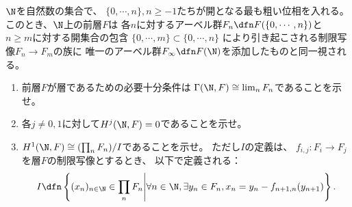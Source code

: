 \documentclass[uplatex,dvipdfmx]{jsarticle}
\begin{document}
\maketitle
\HeaderCommentA
\section{}
\fi


\begin{prob}\label{2.1}
  \(\N\)を自然数の集合で、
  \(\{0,\cdots, n\}, n\geq -1\)たちが開となる最も粗い位相を入れる。
  このとき、\(\N\)上の前層\(F\)は
  各\(n\)に対するアーベル群\(F_n\dfn F(\{0,\cdots,n\})\)と
  \(n\geq m\)に対する開集合の包含
  \(\{0,\cdots, m\} \subset \{0,\cdots ,n\}\)
  により引き起こされる制限写像\(F_n\to F_m\)の族に
  唯一のアーベル群\(F_{\infty}\dfn F(\N)\)を添加したものと同一視される。
  \begin{enumerate}[start=0]
    \item \label{2.1.0}
    前層\(F\)が層であるための必要十分条件は
    \(\Gamma(\N,F) \cong \lim_n F_n\)であることを示せ。
    \item \label{2.1.1}
    各\(j\neq 0,1\)に対して\(H^j(\N,F) = 0\)であることを示せ。
    \item \label{2.1.2}
    \(H^1(\N,F) \cong (\prod_n F_n)/I\)であることを示せ。
    ただし\(I\)の定義は、
    \(f_{i,j}:F_i\to F_j\)を層\(F\)の制限写像とするとき、
    以下で定義される：
    \[
    I\dfn \left\{ (x_n)_{n\in \N}\in \prod_n F_n \middle|
    \forall n\in \N, \exists y_n\in F_n, x_n = y_n - f_{n+1,n}(y_{n+1})\right\}.
    \]
  \end{enumerate}
\end{prob}
\end{document}
